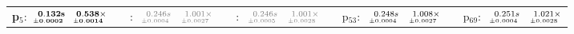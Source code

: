 \documentclass[a4paper,UKenglish]{lipics-v2016}
\begin{document}
\begin{table*}
\begin{adjustbox}{width=1.2\textwidth,center}
\begin{tabular}{rrrp{.1em}rrrp{.1em}rrrp{.1em}rrrp{.1em}rrr}
{\tiny \textbf{p$_{5}$}:}&$\substack{\mathmakebox[.7cm][r]{\mathbf{0.132}}\mathbf{s}\\{\mathmakebox[.7cm][r]{\scriptscriptstyle \mathbf{\pm 0.0002}}}}$&$\substack{\mathmakebox[.7cm][r]{\mathbf{0.538}}\mathbf{\times}\\{\mathmakebox[.7cm][r]{\scriptscriptstyle \mathbf{\pm 0.0014}}}}$&&{\tiny \color{gray}{p$_{21}$}:}&$\substack{\mathmakebox[.7cm][r]{\color{gray}{0.246}}\color{gray}{s}\\{\mathmakebox[.7cm][r]{\scriptscriptstyle \color{gray}{\pm 0.0004}}}}$&$\substack{\mathmakebox[.7cm][r]{\color{gray}{1.001}}\color{gray}{\times}\\{\mathmakebox[.7cm][r]{\scriptscriptstyle \color{gray}{\pm 0.0027}}}}$&&{\tiny \color{gray}{p$_{37}$}:}&$\substack{\mathmakebox[.7cm][r]{\color{gray}{0.246}}\color{gray}{s}\\{\mathmakebox[.7cm][r]{\scriptscriptstyle \color{gray}{\pm 0.0005}}}}$&$\substack{\mathmakebox[.7cm][r]{\color{gray}{1.001}}\color{gray}{\times}\\{\mathmakebox[.7cm][r]{\scriptscriptstyle \color{gray}{\pm 0.0028}}}}$&&{\tiny p$_{53}$:}&$\substack{\mathmakebox[.7cm][r]{0.248}s\\{\mathmakebox[.7cm][r]{\scriptscriptstyle \pm 0.0004}}}$&$\substack{\mathmakebox[.7cm][r]{1.008}\times\\{\mathmakebox[.7cm][r]{\scriptscriptstyle \pm 0.0027}}}$&&{\tiny p$_{69}$:}&$\substack{\mathmakebox[.7cm][r]{0.251}s\\{\mathmakebox[.7cm][r]{\scriptscriptstyle \pm 0.0004}}}$&$\substack{\mathmakebox[.7cm][r]{1.021}\times\\{\mathmakebox[.7cm][r]{\scriptscriptstyle \pm 0.0028}}}$\\

\end{tabular}
\end{adjustbox}
\end{table*}
\end{document}
